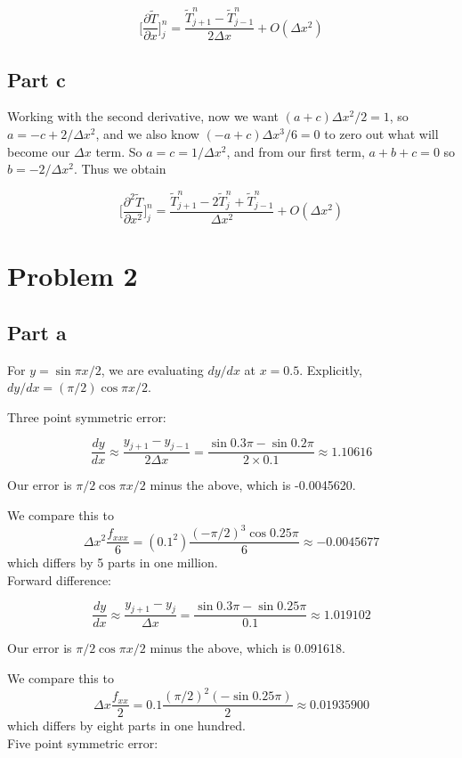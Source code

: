 \documentclass[11pt]{article} %
\begin{document}
\[ \bigg[ \frac{\partial \widetilde{T}}{\partial x} \bigg]^n_j =  \frac{\widetilde{T}^n_{j+1} - \widetilde{T}^n_{j-1}}{2 \Delta x} + O(\Delta x^2)\]

\subsection{Part c}
Working with the second derivative, now we want $(a+c)\Delta x^2/2 = 1$, so $a = -c +2/\Delta x^2$, and we also know $(-a+c)\Delta x^3/6 = 0$ to zero out what will become our $\Delta x$ term. So $a =c =1/\Delta x^2$, and from our first term, $a + b + c = 0$ so $ b = -2/\Delta x^2$. Thus we obtain

\[ \bigg[ \frac{\partial^2 \widetilde{T}}{\partial x^2} \bigg]^n_j =  \frac{\widetilde{T}^n_{j+1} - 2 \widetilde{T}^n_j + \widetilde{T}^n_{j-1}}{\Delta x^2} + O(\Delta x^2)\]

\section{Problem 2}

\subsection{Part a}
For $y = \sin \pi x/2$, we are evaluating $dy/dx$ at $x= 0.5$. Explicitly, $dy/dx = (\pi/2) \cos \pi x / 2$.

Three point symmetric error:

\[ \frac{dy}{dx} \approx \frac{y_{j+1} - y_{j-1}}{2 \Delta x} = \frac{\sin 0.3 \pi - \sin 0.2 \pi}{2 \times 0.1} \approx 1.10616  \]

Our error is $\pi/2 \cos \pi x/2$ minus the above, which is -0.0045620.

We compare this to 
\[ \Delta x^2 \frac{f_{xxx}}{6} = (0.1^2) \frac{(-\pi/2)^3 \cos 0.25 \pi}{6} \approx  -0.0045677\]
which differs by 5 parts in one million.
\\
Forward difference:

\[ \frac{dy}{dx} \approx \frac{y_{j+1} - y_j}{\Delta x} = \frac{\sin 0.3 \pi - \sin 0.25 \pi}{ 0.1} \approx 1.019102  \]

Our error is $\pi/2 \cos \pi x/2$ minus the above, which is 0.091618.

We compare this to 
\[ \Delta x \frac{f_{xx}}{2} = 0.1 \frac{(\pi/2)^2 (-\sin 0.25 \pi)}{2} \approx 0.01935900\]
which differs by eight parts in one hundred.
\\
Five point symmetric error:
\end{document}
